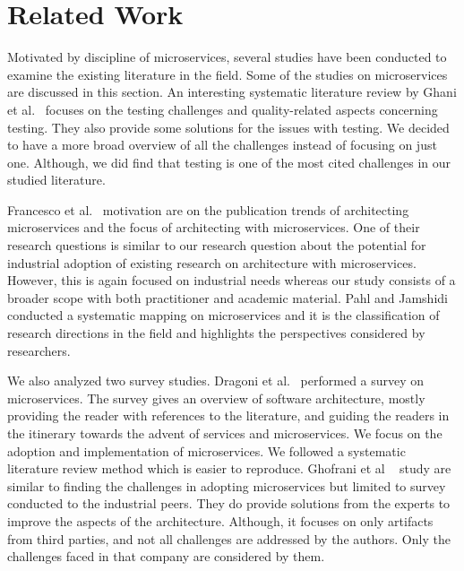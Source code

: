 
\section{Related Work}\label{sec:related-work}

Motivated by discipline of microservices, several studies have been conducted to examine the existing literature in the field. Some of the studies on microservices are discussed in this section.
%
An interesting systematic literature review by Ghani et al.~\cite{Ghani2019} focuses on the testing challenges and quality-related aspects concerning testing. They also provide some solutions for the issues with testing. We decided to have a more broad overview of all the challenges instead of focusing on just one. Although, we did find that testing is one of the most cited challenges in our studied literature. 

Francesco et al.~\cite{Francesco2019} motivation are on the publication trends of architecting microservices and the focus of architecting with microservices. One of their research questions is similar to our research question about the potential for industrial adoption of existing research on architecture with microservices. However, this is again focused on industrial needs whereas our study consists of a broader scope with both practitioner and academic material.
%
Pahl and Jamshidi~\cite{Claus2016} conducted a systematic mapping on microservices and it is the classification of research directions in the field and highlights the perspectives considered by researchers.

We also analyzed two survey studies.
Dragoni et al.~\cite{Dragoni2017} performed a survey on microservices. The survey gives an overview of software architecture, mostly providing the reader with references to the literature, and guiding the readers in the itinerary towards the advent of services and microservices. We focus on the adoption and implementation of microservices. We followed a systematic literature review method which is easier to reproduce.
%
Ghofrani et al ~\cite{ghofrani2018} study are similar to finding the challenges in adopting microservices but limited to survey conducted to the industrial peers. They do provide solutions from the experts to improve the aspects of the architecture. Although, it focuses on only artifacts from third parties, and not all challenges are addressed by the authors. Only the challenges faced in that company are considered by them.
